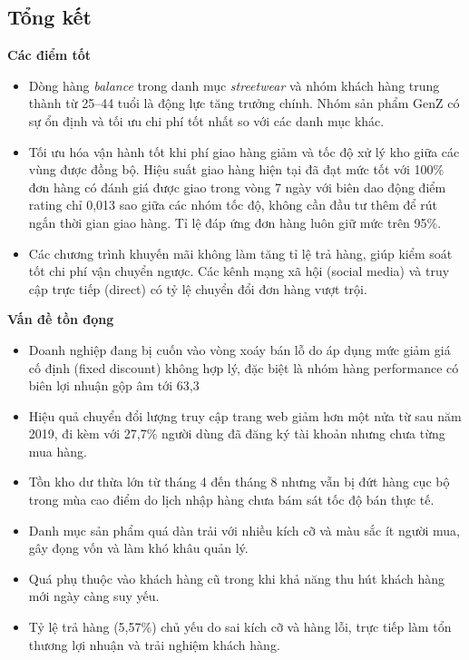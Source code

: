 \documentclass{article}
\begin{document}
\subsection{Tổng kết}

\textbf{Các điểm tốt}
\begin{itemize}[noitemsep,leftmargin=1.2em]
\item Dòng hàng \textit{balance} trong danh mục \textit{streetwear} và nhóm khách hàng trung thành từ 25–44 tuổi là động lực tăng trưởng chính. Nhóm sản phẩm GenZ có sự ổn định và tối ưu chi phí tốt nhất so với các danh mục khác.
\item Tối ưu hóa vận hành tốt khi phí giao hàng giảm và tốc độ xử lý kho giữa các vùng được đồng bộ. Hiệu suất giao hàng hiện tại đã đạt mức tốt với 100\% đơn hàng có đánh giá được giao trong vòng 7 ngày với biên dao động điểm rating chỉ 0,013 sao giữa các nhóm tốc độ, không cần đầu tư thêm để rút ngắn thời gian giao hàng. Tỉ lệ đáp ứng đơn hàng luôn giữ mức trên 95\%.
\item Các chương trình khuyến mãi không làm tăng tỉ lệ trả hàng, giúp kiểm soát tốt chi phí vận chuyển ngược. Các kênh mạng xã hội (social media) và truy cập trực tiếp (direct) có tỷ lệ chuyển đổi đơn hàng vượt trội.
\end{itemize}

\textbf{Vấn đề tồn đọng}
\begin{itemize}[noitemsep,leftmargin=1.2em]
\item Doanh nghiệp đang bị cuốn vào vòng xoáy bán lỗ do áp dụng mức giảm giá cố định (fixed discount) không hợp lý, đặc biệt là nhóm hàng performance có biên lợi nhuận gộp âm tới 63,3%
\item Hiệu quả chuyển đổi lượng truy cập trang web giảm hơn một nửa từ sau năm 2019, đi kèm với 27,7\% người dùng đã đăng ký tài khoản nhưng chưa từng mua hàng.
\item Tồn kho dư thừa lớn từ tháng 4 đến tháng 8 nhưng vẫn bị đứt hàng cục bộ trong mùa cao điểm do lịch nhập hàng chưa bám sát tốc độ bán thực tế.
\item Danh mục sản phẩm quá dàn trải với nhiều kích cỡ và màu sắc ít người mua, gây đọng vốn và làm khó khâu quản lý.
\item Quá phụ thuộc vào khách hàng cũ trong khi khả năng thu hút khách hàng mới ngày càng suy yếu.
\item Tỷ lệ trả hàng (5,57\%) chủ yếu do sai kích cỡ và hàng lỗi, trực tiếp làm tổn thương lợi nhuận và trải nghiệm khách hàng.
\end{itemize}
\end{document}
